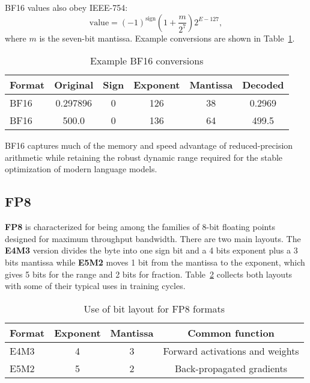 BF16 values also obey IEEE-754:
\[
    \text{value}=(-1)^{\text{sign}}
        \left(1+\frac{m}{2^{7}}\right)
        2^{E-127},
\]
where \(m\) is the seven-bit mantissa.  Example conversions are shown in Table~\ref{tab:bf16-examples}.

\begin{table}[h!]
    \centering
    \begin{tabular}{lccccc}
        \toprule
        Format & Original & Sign & Exponent & Mantissa & Decoded \\
        \midrule
        BF16 & 0.297896 & 0 & 126 & 38 & 0.2969 \\
        BF16 & 500.0    & 0 & 136 & 64 & 499.5 \\
        \bottomrule
    \end{tabular}
    \caption{Example BF16 conversions}
    \label{tab:bf16-examples}
\end{table}

BF16 captures much of the memory and speed advantage of reduced-precision arithmetic while retaining the robust dynamic range required for the stable optimization of modern language models.

\subsection{FP8}
 
\textbf{FP8} is characterized for being among the families of 8-bit floating points designed for maximum throughput bandwidth\cite{nvidia_fp8_primer}. There are two main layouts. The \textbf{E4M3} version divides the byte into one sign bit and a 4 bits exponent plus a 3 bits mantissa while \textbf{E5M2} moves 1 bit from the mantissa to the exponent, which gives 5 bits for the range and 2 bits for fraction. Table~\ref{tab:fp8-layout} collects both layouts with some of their typical uses in training cycles.

\begin{table}[h]

\centering

\caption{Use of bit layout for FP8 formats}

\label{tab:fp8-layout}

\begin{tabular}{|l|c|c|c|}

\hline
\textbf{Format} & \textbf{Exponent} & \textbf{Mantissa} & \textbf{Common function} \\ \hline
E4M3 & 4 & 3 & Forward activations and weights \\ 
E5M2 & 5 & 2 & Back-propagated gradients \\ 

\hline
\end{tabular}

\end{table}


